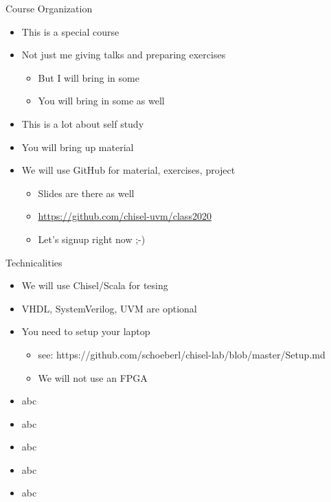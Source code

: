 \begin{frame}[fragile]{Course Organization}
\begin{itemize}
\item This is a special course
\item Not just me giving talks and preparing exercises
\begin{itemize}
\item But I will bring in some
\item You will bring in some as well
\end{itemize}
\item This is a lot about self study
\item You will bring up material
\item We will use GitHub for material, exercises, project
\begin{itemize}
\item Slides are there as well
\item \url{https://github.com/chisel-uvm/class2020}
\item Let's signup right now ;-)
\end{itemize}
\end{itemize}
\end{frame}

\begin{frame}[fragile]{Technicalities}
\begin{itemize}
\item We will use Chisel/Scala for tesing
\item VHDL, SystemVerilog, UVM are optional
\item You need to setup your laptop
\begin{itemize}
\item see: https://github.com/schoeberl/chisel-lab/blob/master/Setup.md
\item We will not use an FPGA
\end{itemize}
\item abc
\item abc
\item abc
\item abc
\item abc
\end{itemize}
\end{frame}

